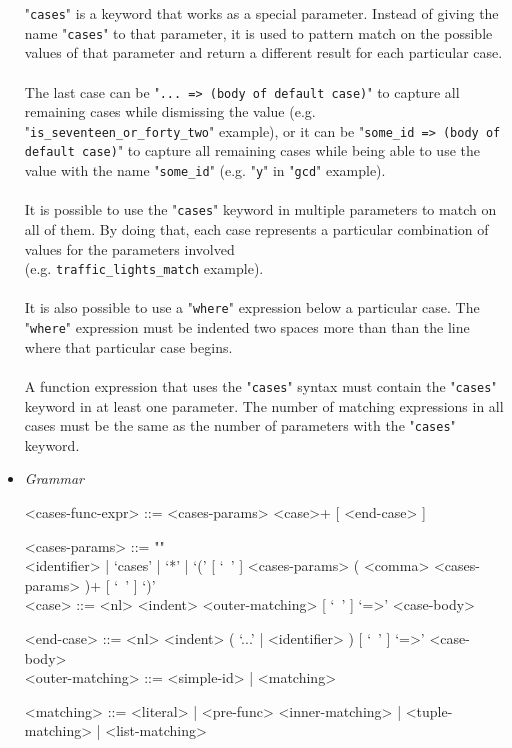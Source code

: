 \documentclass{article}
\begin{document}
\begin{itemize}
"\verb|cases|" is a keyword that works as a special parameter.  Instead of
giving the name "\verb|cases|" to that parameter, it is used to pattern match
on the possible values of that parameter and return a different result for each
particular case.
\\\\
The last case can be "\verb|... => (body of default case)|" to capture all
remaining cases while dismissing the value (e.g.
"\verb|is_seventeen_or_forty_two|" example), or it can be
"\verb|some_id => (body of default case)|" to capture all remaining
cases while being able to use the value with the name "\verb|some_id|"
(e.g.  "\verb|y|" in "\verb|gcd|" example).
\\\\
It is possible to use the "\verb|cases|" keyword in multiple parameters to match on
all of them. By doing that, each case represents a particular combination of
values for the parameters involved\\(e.g. \verb|traffic_lights_match|
example).
\\\\
It is also possible to use a "\verb|where|" expression below a particular case.
The "\verb|where|" expression must be indented two spaces more than than the
line where that particular case begins.
\\\\
A function expression that uses the "\verb|cases|" syntax must contain the
"\verb|cases|" keyword in at least one parameter. The number of matching
expressions in all cases must be the same as the number of parameters with the
"\verb|cases|" keyword.

\item \textit{Grammar}
\begin{grammar}
<cases-func-expr> ::= <cases-params> <case>+ [ <end-case> ]

<cases-params> ::=
""\\
<identifier> | `cases' | `*' |
`(' [ `\ ' ] <cases-params> ( <comma> <cases-params> )+ [ `\ ' ] `)'
\\

<case> ::=  <nl> <indent> <outer-matching> [ `\ ' ] `=>' <case-body>

<end-case> ::=
<nl> <indent> ( `...' | <identifier> ) [ `\ ' ] `=>' <case-body>
\\

<outer-matching> ::= <simple-id> | <matching>

<matching> ::=
<literal> | <pre-func> <inner-matching> | <tuple-matching> | <list-matching>


\end{grammar}
\end{itemize}
\end{document}
